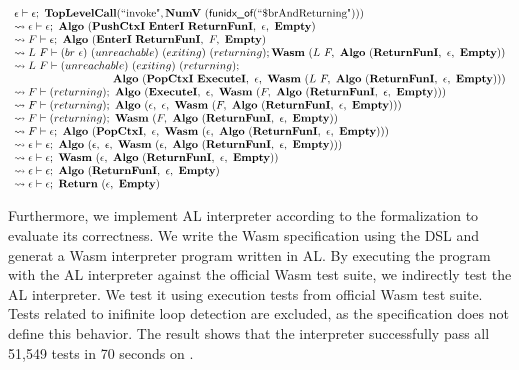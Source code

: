 \[
\begin{array}{l}
  \epsilon \vdash \epsilon; ~ \textbf{TopLevelCall}(\text{``invoke"}, \textbf{NumV} ~ (\textsf{funidx\_of}(\text{``\$brAndReturning"})))
  \\
  \leadsto \epsilon \vdash \epsilon; ~ \textbf{Algo} ~ (\textbf{PushCtxI} ~ \textbf{EnterI} ~ \textbf{ReturnFunI}, ~ \epsilon, ~ \textbf{Empty})
  \\
  \leadsto F \vdash \epsilon; ~ \textbf{Algo} ~ (\textbf{EnterI} ~ \textbf{ReturnFunI}, ~ F, ~ \textbf{Empty})
  \\
  \leadsto L ~ F \vdash (br ~ \epsilon) ~ (unreachable) ~ (exiting) ~ (returning); \textbf{Wasm} ~ (L ~ F, ~ \textbf{Algo} ~ (\textbf{ReturnFunI}, ~ \epsilon, ~ \textbf{Empty}))
  \\
  \leadsto L ~ F \vdash (unreachable) ~ (exiting) ~ (returning); \\
  \quad\qquad\qquad\qquad\qquad \textbf{Algo} ~ (\textbf{PopCtxI} ~ \textbf{ExecuteI}, ~ \epsilon, ~ \textbf{Wasm} ~ (L ~ F, ~ \textbf{Algo} ~ (\textbf{ReturnFunI}, ~ \epsilon, ~ \textbf{Empty})))
  \\
  \leadsto F \vdash (returning); ~
    \textbf{Algo} ~ (\textbf{ExecuteI}, ~ \epsilon, ~ \textbf{Wasm} ~ (F, ~ \textbf{Algo} ~ (\textbf{ReturnFunI}, ~ \epsilon, ~ \textbf{Empty})))
  \\
  \leadsto F \vdash (returning); ~
    \textbf{Algo} ~ (\epsilon, ~ \epsilon, ~ \textbf{Wasm} ~ (F, ~ \textbf{Algo} ~ (\textbf{ReturnFunI}, ~ \epsilon, ~ \textbf{Empty})))
  \\
  \leadsto F \vdash (returning); ~ \textbf{Wasm} ~ (F, ~ \textbf{Algo} ~ (\textbf{ReturnFunI}, ~ \epsilon, ~ \textbf{Empty}))
  \\
  \leadsto F \vdash \epsilon; ~
    \textbf{Algo} ~ (\textbf{PopCtxI}, ~ \epsilon, ~ \textbf{Wasm} ~ (\epsilon, ~ \textbf{Algo} ~ (\textbf{ReturnFunI}, ~ \epsilon, ~ \textbf{Empty})))
  \\
  \leadsto \epsilon \vdash \epsilon; ~
    \textbf{Algo} ~ (\epsilon, ~ \epsilon, ~ \textbf{Wasm} ~ (\epsilon, ~ \textbf{Algo} ~ (\textbf{ReturnFunI}, ~ \epsilon, ~ \textbf{Empty})))
  \\
  \leadsto \epsilon \vdash \epsilon; ~ \textbf{Wasm} ~ (\epsilon, ~ \textbf{Algo} ~ (\textbf{ReturnFunI}, ~ \epsilon, ~ \textbf{Empty}))
  \\
  \leadsto \epsilon \vdash \epsilon; ~ \textbf{Algo} ~ (\textbf{ReturnFunI}, ~ \epsilon, ~ \textbf{Empty})
  \\
  \leadsto \epsilon \vdash \epsilon; ~ \textbf{Return} ~ (\epsilon, ~ \textbf{Empty})
  \\
\end{array}
\]

Furthermore, we implement AL interpreter according to the formalization to
evaluate its correctness.
We write the Wasm specification using the DSL and generat a Wasm interpreter
program written in AL.
By executing the program with the AL interpreter against the official Wasm test
suite, we indirectly test the AL interpreter.
We test it using execution tests from official Wasm test suite.
Tests related to inifinite loop detection are excluded, as the specification
does not define this behavior.
The result shows that the interpreter successfully pass all 51,549 tests in 70
seconds on .


